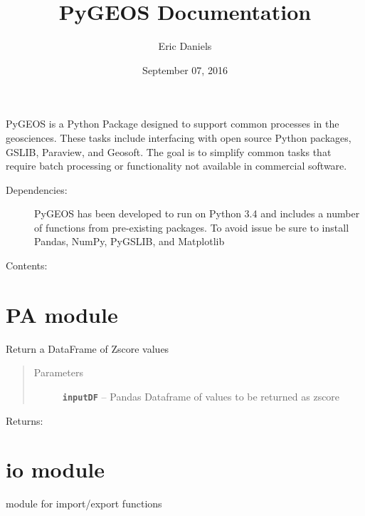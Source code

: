 \documentclass[letterpaper,10pt,english]{sphinxmanual}
\title{PyGEOS Documentation}
\date{September 07, 2016}
\author{Eric Daniels}
\begin{document}
\maketitle
\tableofcontents
{}\label{index::doc}


PyGEOS is a Python Package designed to support common processes in the geosciences.
These tasks include interfacing with open source Python packages, GSLIB, Paraview, and Geosoft.
The goal is to simplify common tasks that require batch processing or functionality not available in commercial software.
\begin{description}
\item[{Dependencies:}] \leavevmode
PyGEOS has been developed to run on Python 3.4 and includes a number of functions from pre-existing packages.
To avoid issue be sure to install Pandas, NumPy, PyGSLIB,  and Matplotlib

\end{description}

Contents:


\chapter{PA module}
\label{index:pygeos-documentation}\label{index:pa-module}\label{index:module-pygeos.PA}

\begin{fulllineitems}
\label{index:pygeos.PA.zscore}
Return a DataFrame of Zscore values
\begin{quote}\begin{description}
\item[{Parameters}] \leavevmode
\textbf{\texttt{inputDF}} -- Pandas Dataframe of values to be returned as zscore

\end{description}\end{quote}

Returns:

\end{fulllineitems}



\chapter{io module}
\label{index:module-pygeos.io}\label{index:io-module}
module for import/export functions
\end{document}
